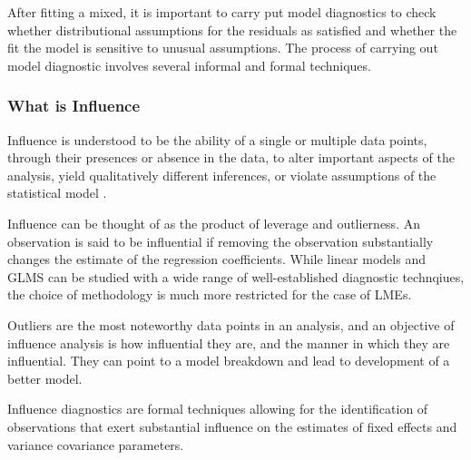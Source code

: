 \documentclass[12pt, a4paper]{report}
\theoremstyle{plain}
\theoremstyle{definition}
\theoremstyle{remark}
\begin{document}
	After fitting a mixed, it is important to carry put model diagnostics to check whether distributional assumptions for the
	residuals as satisfied and whether the fit the model is sensitive to unusual assumptions. The process of carrying out model
	diagnostic involves several informal and formal techniques.
	
	
	\subsubsection{What is Influence} %
	Influence is understood to be the ability of a single or multiple data points, through their presences or absence in the data, to
	alter important aspects of the analysis, yield qualitatively different inferences, or violate assumptions of the statistical
	model \citep{schabenberger}.
	
	Influence can be thought of as the product of leverage and outlierness. An observation is said to be influential if removing the observation substantially changes the estimate of the regression coefficients.  While linear models and GLMS can be studied with a wide range of well-established diagnostic technqiues, the choice of methodology is much more restricted for the case of LMEs.
	
	Outliers are the most noteworthy data points in an analysis, and an objective of influence analysis is how influential they are,
	and the manner in which they are influential. They can point to a model breakdown and lead to development of a better model.
	
	

	
	Influence diagnostics are formal techniques allowing for the identification of observations that exert substantial  influence on the estimates of fixed effects and variance covariance parameters.
		
\end{document}
